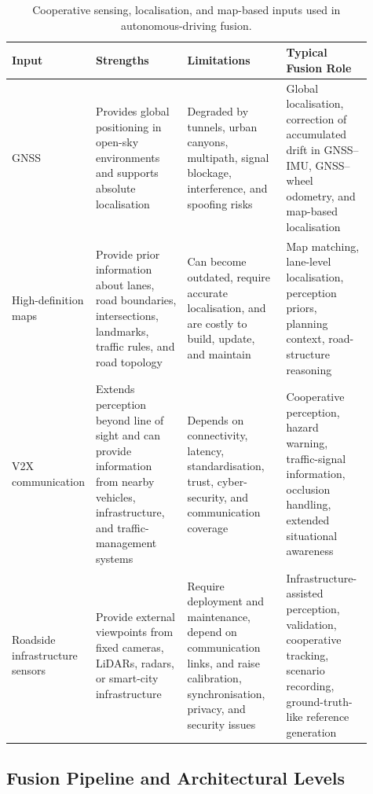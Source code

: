 \documentclass{ieeeaccess}
\begin{document}
\begin{table}[!t]
    \centering
    \small
    \caption{Cooperative sensing, localisation, and map-based inputs used in autonomous-driving fusion.}
    \label{tab:av-cooperative-inputs}
    \begin{tabular}{p{0.13\linewidth} p{0.26\linewidth} p{0.28\linewidth} p{0.24\linewidth}}
        \hline
        \textbf{Input} & \textbf{Strengths} & \textbf{Limitations} & \textbf{Typical Fusion Role} \\
        \hline
        GNSS & Provides global positioning in open-sky environments and supports absolute localisation & Degraded by tunnels, urban canyons, multipath, signal blockage, interference, and spoofing risks & Global localisation, correction of accumulated drift in GNSS--IMU, GNSS--wheel odometry, and map-based localisation \\
        \hline
        High-definition maps & Provide prior information about lanes, road boundaries, intersections, landmarks, traffic rules, and road topology & Can become outdated, require accurate localisation, and are costly to build, update, and maintain & Map matching, lane-level localisation, perception priors, planning context, road-structure reasoning \\
        \hline
        V2X communication & Extends perception beyond line of sight and can provide information from nearby vehicles, infrastructure, and traffic-management systems & Depends on connectivity, latency, standardisation, trust, cyber-security, and communication coverage & Cooperative perception, hazard warning, traffic-signal information, occlusion handling, extended situational awareness \\
        \hline
        Roadside infrastructure sensors & Provide external viewpoints from fixed cameras, LiDARs, radars, or smart-city infrastructure & Require deployment and maintenance, depend on communication links, and raise calibration, synchronisation, privacy, and security issues & Infrastructure-assisted perception, validation, cooperative tracking, scenario recording, ground-truth-like reference generation \\
        \hline
    \end{tabular}
\end{table}

\subsection{Fusion Pipeline and Architectural Levels}
\end{document}
